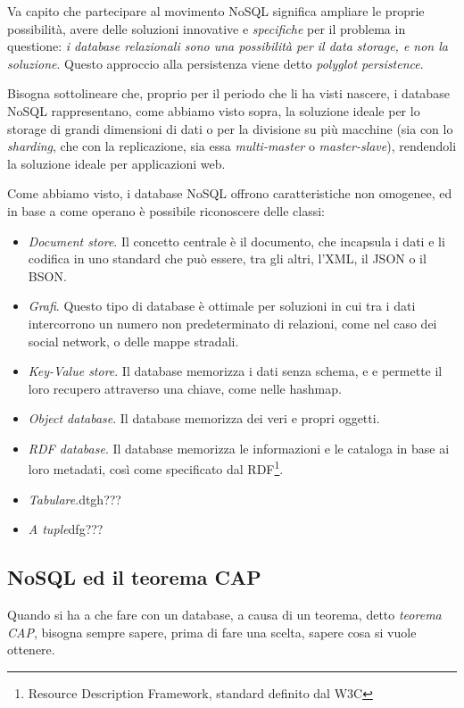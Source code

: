 Va capito che partecipare al movimento NoSQL significa ampliare le proprie possibilità, avere delle soluzioni innovative e \emph{specifiche} per il problema in questione: \emph{i database relazionali sono una possibilità per il data storage, e non la soluzione}. Questo approccio alla persistenza viene detto \emph{polyglot persistence}.

Bisogna sottolineare che, proprio per il periodo che li ha visti nascere, i database NoSQL rappresentano, come abbiamo visto sopra, la soluzione ideale per lo storage di grandi dimensioni di dati o per la divisione su più macchine (sia con lo \emph{sharding}, che con la replicazione, sia essa \emph{multi-master} o \emph{master-slave}), rendendoli la soluzione ideale per applicazioni web.

Come abbiamo visto, i database NoSQL offrono caratteristiche non omogenee, ed in base a come operano è possibile riconoscere delle classi:
\begin{itemize}
\item \emph{Document store}. Il concetto centrale è il documento, che incapsula i dati e li codifica in uno standard che può essere, tra gli altri, l'XML, il JSON o il BSON.
\item \emph{Grafi}. Questo tipo di database è ottimale per soluzioni in cui tra i dati intercorrono un numero non predeterminato di relazioni, come nel caso dei social network, o delle mappe stradali.
\item \emph{Key-Value store}. Il database memorizza i dati senza schema, e e permette il loro recupero attraverso una chiave, come nelle hashmap.
\item \emph{Object database}. Il database memorizza dei veri e propri oggetti.
\item \emph{RDF database}. Il database memorizza le informazioni e le cataloga in base ai loro metadati, così come specificato dal RDF\footnote{Resource Description Framework, standard definito dal W3C}.
\item \emph{Tabulare}.dtgh???
\item \emph{A tuple}dfg???
\end{itemize}

\subsection{NoSQL ed il teorema CAP}
Quando si ha a che fare con un database, a causa di un teorema, detto \emph{teorema CAP}, bisogna sempre sapere, prima di fare una scelta, sapere cosa si vuole ottenere.

